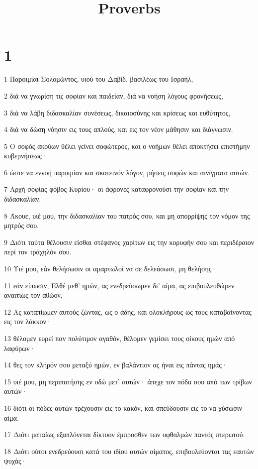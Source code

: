 

\title{Proverbs}


\chapter{1}

\par 1 Παροιμίαι Σολομώντος, υιού του Δαβίδ, βασιλέως του Ισραήλ,
\par 2 διά να γνωρίση τις σοφίαν και παιδείαν, διά να νοήση λόγους φρονήσεως,
\par 3 διά να λάβη διδασκαλίαν συνέσεως, δικαιοσύνης και κρίσεως και ευθύτητος,
\par 4 διά να δώση νόησιν εις τους απλούς, και εις τον νέον μάθησιν και διάγνωσιν.
\par 5 Ο σοφός ακούων θέλει γείνει σοφώτερος, και ο νοήμων θέλει αποκτήσει επιστήμην κυβερνήσεως·
\par 6 ώστε να εννοή παροιμίαν και σκοτεινόν λόγον, ρήσεις σοφών και αινίγματα αυτών.
\par 7 Αρχή σοφίας φόβος Κυρίου· οι άφρονες καταφρονούσι την σοφίαν και την διδασκαλίαν.
\par 8 Άκουε, υιέ μου, την διδασκαλίαν του πατρός σου, και μη απορρίψης τον νόμον της μητρός σου.
\par 9 Διότι ταύτα θέλουσιν είσθαι στέφανος χαρίτων εις την κορυφήν σου και περιδέραιον περί τον τράχηλόν σου.
\par 10 Υιέ μου, εάν θελήσωσιν οι αμαρτωλοί να σε δελεάσωσι, μη θελήσης·
\par 11 εάν είπωσιν, Ελθέ μεθ' ημών, ας ενεδρεύσωμεν δι' αίμα, ας επιβουλευθώμεν αναιτίως τον αθώον,
\par 12 Ας καταπίωμεν αυτούς ζώντας, ως ο άδης, και ολοκλήρους ως τους καταβαίνοντας εις τον λάκκον·
\par 13 θέλομεν ευρεί παν πολύτιμον αγαθόν, θέλομεν γεμίσει τους οίκους ημών από λαφύρων·
\par 14 θες τον κλήρόν σου μεταξύ ημών, εν βαλάντιον ας ήναι εις πάντας ημάς·
\par 15 υιέ μου, μη περιπατήσης εν οδώ μετ' αυτών· άπεχε τον πόδα σου από των τρίβων αυτών·
\par 16 διότι οι πόδες αυτών τρέχουσιν εις το κακόν, και σπεύδουσιν εις το να χύσωσιν αίμα.
\par 17 Διότι ματαίως εξαπλόνεται δίκτυον έμπροσθεν των οφθαλμών παντός πτερωτού.
\par 18 Διότι ούτοι ενεδρεύουσι κατά του ιδίου αυτών αίματος, επιβουλεύονται τας εαυτών ψυχάς·
